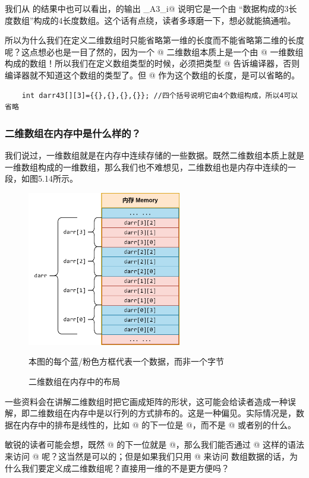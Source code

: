 我们从 \lstinline@typeid@ 的结果中也可以看出，\lstinline@darr@ 的输出 _A3_i@ 说明它是一个由 ``\lstinline@int@ 数据构成的3长度数组''构成的4长度数组。这个话有点绕，读者多琢磨一下，想必就能搞通啦。\par
所以为什么我们在定义二维数组时只能省略第一维的长度而不能省略第二维的长度呢？这点想必也是一目了然的，因为一个 \lstinline@int[4][3]@ 二维数组本质上是一个由 \lstinline@int[3]@ 一维数组构成的数组！所以我们在定义数组类型的时候，必须把类型 \lstinline@int[3]@ 告诉编译器，否则编译器就不知道这个数组的类型了。但 @ 作为这个数组的长度，是可以省略的。
\begin{lstlisting}
    int darr43[][3]={{},{},{},{}}; //四个括号说明它由4个数组构成，所以4可以省略
\end{lstlisting}\par
\subsubsection*{二维数组在内存中是什么样的？}
我们说过，一维数组就是在内存中连续存储的一些数据。既然二维数组本质上就是一维数组构成的一维数组，那么我们也不难想见，二维数组也是内存中连续的一段，如图5.14所示。\par
\begin{figure}[htbp]
    \centering
    \includegraphics[width=0.6\textwidth]{../images/generalized_parts/05_data_in_the_array_of_array.drawio.png}
    \caption{二维数组在内存中的布局}
    \footnotesize{本图的每个蓝/粉色方框代表一个数据，而非一个字节}
\end{figure}
一些资料会在讲解二维数组时把它画成矩阵的形状，这可能会给读者造成一种误解，即二维数组在内存中是以行列的方式排布的。这是一种偏见。实际情况是，数据在内存中的排布是线性的，比如 \lstinline@darr[0][3]@ 的下一位是 \lstinline@darr[1][0]@，而不是 \lstinline@darr[1][3]@ 或者别的什么。\par
敏锐的读者可能会想，既然 \lstinline@darr[0][3]@ 的下一位就是 \lstinline@darr[1][0]@，那么我们能否通过 \lstinline@darr[0][4]@ 这样的语法来访问 \lstinline@darr[1][0]@ 呢？这当然是可以的；但是如果我们只用 \lstinline@darr[0][i]@ 来访问 数组数据的话，为什么我们要定义成二维数组呢？直接用一维的不是更方便吗？\par
